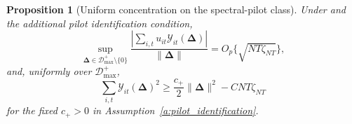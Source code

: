 \documentclass[11pt]{article}
\numberwithin{equation}{section}
\newtheorem{proposition}{Proposition}
\theoremstyle{remark}
\newcommand{\bDelta}{\bm\Delta}
\newcommand{\calD}{\mathcal D}
\begin{document}
\begin{proposition}[Uniform concentration on the spectral-pilot class]
\label{prop:uniform_concentration_pilot}
Under  and the additional pilot identification condition,
\begin{equation}
\label{eq:pilot_score_bound}
\sup_{\bDelta\in\calD_{\max}^{+}\setminus\{0\}}
\frac{|\sum_{i,t}u_{it}\mathcal Y_{it}(\bDelta)|}{\|\bDelta\|}
=O_p\{\sqrt{NT\zeta_{NT}}\},
\end{equation}
and, uniformly over $\calD_{\max}^{+}$,
\begin{equation}
\label{eq:pilot_curvature_bound}
\sum_{i,t}\mathcal Y_{it}(\bDelta)^2
\ge
\frac{c_+}{2}\|\bDelta\|^2-CNT\zeta_{NT}
\end{equation}
for the fixed $c_+>0$ in Assumption~\ref{a:pilot_identification}.
\end{proposition}
\end{document}
